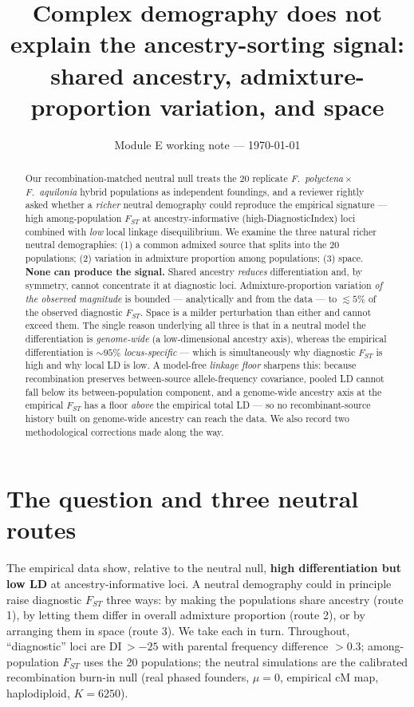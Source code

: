 \documentclass[11pt,a4paper]{article}
\title{Complex demography does not explain the ancestry-sorting signal:
shared ancestry, admixture-proportion variation, and space}
\author{}
\date{Module E working note --- \today}
\begin{document}
\maketitle
\vspace{-2em}

\begin{abstract}\noindent
Our recombination-matched neutral null treats the 20 replicate
\textit{F.\ polyctena}\,$\times$\,\textit{F.\ aquilonia} hybrid populations as
independent foundings, and a reviewer rightly asked whether a \emph{richer} neutral
demography could reproduce the empirical signature --- high among-population $F_{ST}$
at ancestry-informative (high-DiagnosticIndex) loci combined with \emph{low} local
linkage disequilibrium. We examine the three natural richer neutral demographies:
(1) a common admixed source that splits into the 20 populations; (2) variation in
admixture proportion among populations; (3) space. \textbf{None can produce the
signal.} Shared ancestry \emph{reduces} differentiation and, by symmetry, cannot
concentrate it at diagnostic loci. Admixture-proportion variation \emph{of the
observed magnitude} is bounded --- analytically and from the data --- to
$\lesssim 5\%$ of the observed diagnostic $F_{ST}$. Space is a milder perturbation
than either and cannot exceed them. The single reason underlying all three is that in
a neutral model the differentiation is \emph{genome-wide} (a low-dimensional ancestry
axis), whereas the empirical differentiation is $\sim\!95\%$ \emph{locus-specific} ---
which is simultaneously why diagnostic $F_{ST}$ is high and why local LD is low. A
model-free \emph{linkage floor} sharpens this: because recombination preserves
between-source allele-frequency covariance, pooled LD cannot fall below its
between-population component, and a genome-wide ancestry axis at the empirical $F_{ST}$
has a floor \emph{above} the empirical total LD --- so no recombinant-source history
built on genome-wide ancestry can reach the data. We also record two methodological
corrections made along the way.
\end{abstract}

\section{The question and three neutral routes}
The empirical data show, relative to the neutral null, \textbf{high differentiation but
low LD} at ancestry-informative loci. A neutral demography could in principle raise
diagnostic $F_{ST}$ three ways: by making the populations share ancestry (route 1), by
letting them differ in overall admixture proportion (route 2), or by arranging them in
space (route 3). We take each in turn. Throughout, ``diagnostic'' loci are
DI\,$>-25$ with parental frequency difference $>0.3$; among-population $F_{ST}$ uses the
20 populations; the neutral simulations are the calibrated recombination burn-in null
(real phased founders, $\mu=0$, empirical cM map, haplodiploid, $K=6250$).
\end{document}
